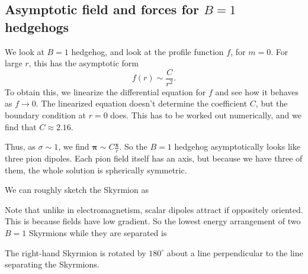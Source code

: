 \documentclass[a4paper]{article}
\begin{document}
\subsection{Asymptotic field and forces for \texorpdfstring{$B = 1$}{B = 1} hedgehogs}
We look at $B = 1$ hedgehog, and look at the profile function $f$, for $m = 0$. For large $r$, this has the asymptotic form
\[
  f(r) \sim \frac{C}{r^2}.
\]
To obtain this, we linearize the differential equation for $f$ and see how it behaves as $f \to 0$. The linearized equation doesn't determine the coefficient $C$, but the boundary condition at $r = 0$ does. This has to be worked out numerically, and we find that $C \approx 2.16$.

Thus, as $ \sigma \sim 1$, we find $\boldsymbol\pi \sim C \frac{\mathbf{x}}{r}$. So the $B = 1$ hedgehog asymptotically looks like three pion dipoles. Each pion field itself has an axis, but because we have three of them, the whole solution is spherically symmetric.

We can roughly sketch the Skyrmion as
\begin{center}
\end{center}
Note that unlike in electromagnetism, scalar dipoles attract if oppositely oriented. This is because fields have low gradient. So the lowest energy arrangement of two $B = 1$ Skyrmions while they are separated is

\begin{center}
\end{center}
The right-hand Skyrmion is rotated by $180^\circ$ about a line perpendicular to the line separating the Skyrmions.
\end{document}
